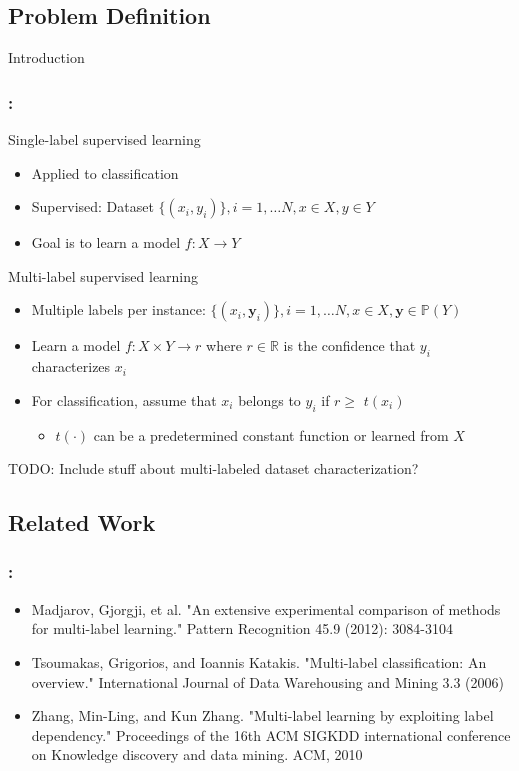 \documentclass{beamer}
\begin{document}
\subsection{Problem Definition}
\begin{frame}
\Huge{\centerline{Introduction}}
\end{frame}
\begin{frame}
\frametitle{\insertsection : \insertsubsection}
Single-label supervised learning
\begin{itemize}
\item Applied to classification
\item Supervised: Dataset $\{ (x_i, y_i)\}, i = 1, \dots N, x \in X, y \in Y$
\item Goal is to learn a model $f: X \rightarrow Y$
\end{itemize}

Multi-label supervised learning
\begin{itemize}
\item Multiple labels per instance: $\{ (x_i, \bm{y}_i)\}, i = 1, \dots N, x \in X, \bm{y} \in \mathbb{P}(Y)$
\item Learn a model $f: X \times Y \rightarrow r$ where $r\in \mathbb{R}$ is the confidence that $y_i$ characterizes $x_i$
\item For classification, assume that $x_i$ belongs to $y_i$ if $r \ge $ $t(x_i)$

\begin{itemize}
\item $t(\cdot)$ can be a predetermined constant function or learned from $X$
\end{itemize}

\end{itemize}
TODO: Include stuff about multi-labeled dataset characterization?
\end{frame}
\subsection{Related Work}
\begin{frame}
\frametitle{\insertsection : \insertsubsection}
\begin{itemize}
\item Madjarov, Gjorgji, et al. "An extensive experimental comparison of methods for multi-label learning." Pattern Recognition 45.9 (2012): 3084-3104
\item Tsoumakas, Grigorios, and Ioannis Katakis. "Multi-label classification: An overview." International Journal of Data Warehousing and Mining 3.3 (2006)
\item Zhang, Min-Ling, and Kun Zhang. "Multi-label learning by exploiting label dependency." Proceedings of the 16th ACM SIGKDD international conference on Knowledge discovery and data mining. ACM, 2010
\end{itemize}
\end{frame}
\end{document}
